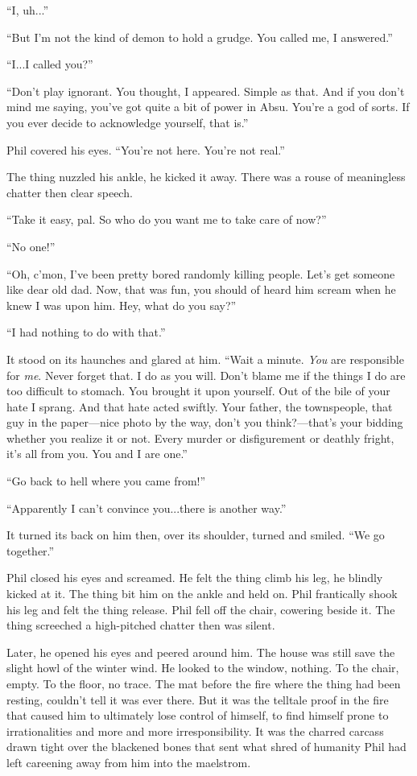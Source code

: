 \documentclass[
]{article}
\begin{document}
``I, uh...''

``But I'm not the kind of demon to hold a grudge. You called me, I
answered.''

``I...I called you?''

``Don't play ignorant. You thought, I appeared. Simple as that. And if
you don't mind me saying, you've got quite a bit of power in Absu.
You're a god of sorts. If you ever decide to acknowledge yourself, that
is.''

Phil covered his eyes. ``You're not here. You're not real.''

The thing nuzzled his ankle, he kicked it away. There was a rouse of
meaningless chatter then clear speech.

``Take it easy, pal. So who do you want me to take care of now?''

``No one!''

``Oh, c'mon, I've been pretty bored randomly killing people. Let's get
someone like dear old dad. Now, that was fun, you should of heard him
scream when he knew I was upon him. Hey, what do you say?''

``I had nothing to do with that.''

It stood on its haunches and glared at him. ``Wait a minute. \emph{You}
are responsible for \emph{me}. Never forget that. I do as you will.
Don't blame me if the things I do are too difficult to stomach. You
brought it upon yourself. Out of the bile of your hate I sprang. And
that hate acted swiftly. Your father, the townspeople, that guy in the
paper---nice photo by the way, don't you think?---that's your bidding
whether you realize it or not. Every murder or disfigurement or deathly
fright, it's all from you. You and I are one.''

``Go back to hell where you came from!''

``Apparently I can't convince you...there is another way.''

It turned its back on him then, over its shoulder, turned and smiled.
``We go together.''

Phil closed his eyes and screamed. He felt the thing climb his leg, he
blindly kicked at it. The thing bit him on the ankle and held on. Phil
frantically shook his leg and felt the thing release. Phil fell off the
chair, cowering beside it. The thing screeched a high-pitched chatter
then was silent.

Later, he opened his eyes and peered around him. The house was still
save the slight howl of the winter wind. He looked to the window,
nothing. To the chair, empty. To the floor, no trace. The mat before the
fire where the thing had been resting, couldn't tell it was ever there.
But it was the telltale proof in the fire that caused him to ultimately
lose control of himself, to find himself prone to irrationalities and
more and more irresponsibility. It was the charred carcass drawn tight
over the blackened bones that sent what shred of humanity Phil had left
careening away from him into the maelstrom.
\end{document}
